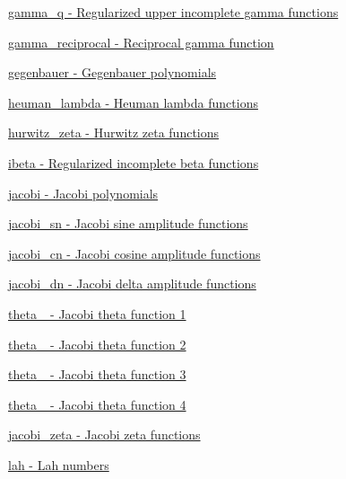 \begin{DoxyItemize}
\item \hyperlink{group__gnu__math__spec__func_ga10c246b2fa2ce000dc5d7c81e9e98c58}{gamma\+\_\+q -\/ Regularized upper incomplete gamma functions}
\item \hyperlink{group__gnu__math__spec__func_ga641f9bcdb8fc32a9a0ce7a15b5040076}{gamma\+\_\+reciprocal -\/ Reciprocal gamma function}
\item \hyperlink{group__gnu__math__spec__func_ga512e7981e328d6184f604de1892048b6}{gegenbauer -\/ Gegenbauer polynomials}
\item \hyperlink{group__gnu__math__spec__func_ga7537f96eedc8571ed1987481b2863e89}{heuman\+\_\+lambda -\/ Heuman lambda functions}
\item \hyperlink{group__gnu__math__spec__func_ga7b167ce1c8d9aa6aad40fc83a95733bd}{hurwitz\+\_\+zeta -\/ Hurwitz zeta functions}
\item \hyperlink{group__gnu__math__spec__func_ga1fa9e260ba85fc043e3d2ada99c0143c}{ibeta -\/ Regularized incomplete beta functions}
\item \hyperlink{group__gnu__math__spec__func_gad54f6601748324d268532138eb38ca33}{jacobi -\/ Jacobi polynomials}
\item \hyperlink{group__gnu__math__spec__func_ga49d5e18152dd0dd0f496b8c8582e7045}{jacobi\+\_\+sn -\/ Jacobi sine amplitude functions}
\item \hyperlink{group__gnu__math__spec__func_ga2e1c43b232d378164bed1433041ca7dc}{jacobi\+\_\+cn -\/ Jacobi cosine amplitude functions}
\item \hyperlink{group__gnu__math__spec__func_ga0f8fa8d6a77dbc2089d65f3f16876aa9}{jacobi\+\_\+dn -\/ Jacobi delta amplitude functions}
\item \hyperlink{group__gnu__math__spec__func_ga996ca8c1fff75e2d4f196e99e0919933}{theta\+\_ -\/ Jacobi theta function 1}
\item \hyperlink{group__gnu__math__spec__func_gaf6b13dac1f112a870299d75cb4cf42cc}{theta\+\_ -\/ Jacobi theta function 2}
\item \hyperlink{group__gnu__math__spec__func_gaf4eac2990db1dadba66ae688ceaa6403}{theta\+\_ -\/ Jacobi theta function 3}
\item \hyperlink{group__gnu__math__spec__func_ga676501b6284d5702a3dc61252e6c78ab}{theta\+\_ -\/ Jacobi theta function 4}
\item \hyperlink{group__gnu__math__spec__func_ga639be4ebef9a20572375ec534be52b07}{jacobi\+\_\+zeta -\/ Jacobi zeta functions}
\item \hyperlink{group__gnu__math__spec__func_gaa3491fabb0a6ef54a946a7a23ca866c7}{lah -\/ Lah numbers}

\end{DoxyItemize}
